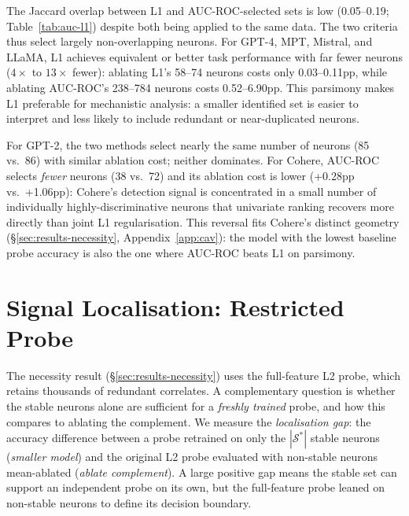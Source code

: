 \documentclass[11pt]{article}
\begin{document}
The Jaccard overlap between L1 and AUC-ROC-selected sets is low (0.05--0.19; Table~\ref{tab:auc-l1}) despite both being applied to the same data. The two criteria thus select largely non-overlapping neurons. For GPT-4, MPT, Mistral, and LLaMA, L1 achieves equivalent or better task performance with far fewer neurons ($4\times$ to $13\times$ fewer): ablating L1's 58--74 neurons costs only 0.03--0.11pp, while ablating AUC-ROC's 238--784 neurons costs 0.52--6.90pp. This parsimony makes L1 preferable for mechanistic analysis: a smaller identified set is easier to interpret and less likely to include redundant or near-duplicated neurons.

For GPT-2, the two methods select nearly the same number of neurons (85 vs.\ 86) with similar ablation cost; neither dominates. For Cohere, AUC-ROC selects \emph{fewer} neurons (38 vs.\ 72) and its ablation cost is lower (+0.28pp vs.\ +1.06pp): Cohere's detection signal is concentrated in a small number of individually highly-discriminative neurons that univariate ranking recovers more directly than joint L1 regularisation. This reversal fits Cohere's distinct geometry (§\ref{sec:results-necessity}, Appendix~\ref{app:cav}): the model with the lowest baseline probe accuracy is also the one where AUC-ROC beats L1 on parsimony.

\section{Signal Localisation: Restricted Probe}
\label{app:restricted}

The necessity result (§\ref{sec:results-necessity}) uses the full-feature L2 probe, which retains thousands of redundant correlates. A complementary question is whether the stable neurons alone are sufficient for a \textit{freshly trained} probe, and how this compares to ablating the complement. We measure the \textit{localisation gap}: the accuracy difference between a probe retrained on only the $|\mathcal{S}^{*}|$ stable neurons (\textit{smaller model}) and the original L2 probe evaluated with non-stable neurons mean-ablated (\textit{ablate complement}). A large positive gap means the stable set can support an independent probe on its own, but the full-feature probe leaned on non-stable neurons to define its decision boundary.
\end{document}
